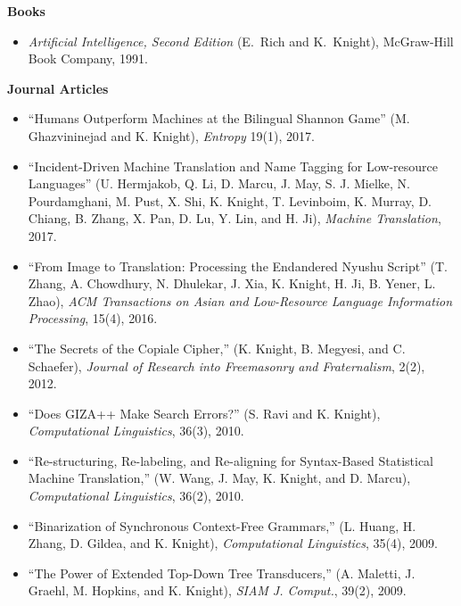 
\vspace{0.2in}

\noindent
{\bf Books}

\begin{itemize}
\item {\em Artificial Intelligence, Second Edition} (E.~Rich and K.~Knight),
McGraw-Hill Book Company, 1991.
\end{itemize}


\noindent
{\bf Journal Articles}
\begin{itemize}
\item ``Humans Outperform Machines at the Bilingual Shannon Game'' (M. Ghazvininejad and K. Knight), {\em Entropy} 19(1), 2017.

\item ``Incident-Driven Machine Translation and Name Tagging for Low-resource Languages'' (U. Hermjakob, Q. Li, D. Marcu, J. May, S. J. Mielke, N. Pourdamghani, M. Pust, X. Shi, K. Knight, T. Levinboim, K. Murray, D. Chiang, B. Zhang, X. Pan, D. Lu, Y. Lin, and H. Ji), {\em Machine Translation}, 2017.

\item ``From Image to Translation: Processing the Endandered Nyushu Script'' (T. Zhang, A. Chowdhury, N. Dhulekar, J. Xia, K. Knight, H. Ji, B. Yener, L. Zhao), {\em ACM Transactions on Asian and Low-Resource Language Information Processing}, 15(4), 2016. 

\item ``The Secrets of the Copiale Cipher,'' 
(K. Knight, B. Megyesi, and C. Schaefer), 
{\em Journal of Research into Freemasonry and Fraternalism}, 2(2), 2012. 

\item ``Does GIZA++ Make Search Errors?'' (S. Ravi and K. Knight),
{\em Computational Linguistics}, 36(3), 2010.

\item ``Re-structuring, Re-labeling, and Re-aligning for Syntax-Based
Statistical Machine Translation,'' (W. Wang, J. May, K. Knight, 
and D. Marcu), {\em Computational Linguistics}, 36(2), 2010.

\item ``Binarization of Synchronous Context-Free Grammars,'' (L. Huang, 
H. Zhang, D. Gildea, and K. Knight), {\em Computational Linguistics}, 
35(4), 2009.

\item ``The Power of Extended Top-Down Tree Transducers,''
(A. Maletti, J. Graehl, M. Hopkins, and K. Knight),
{\em SIAM J. Comput.}, 39(2), 2009.


\end{itemize}
